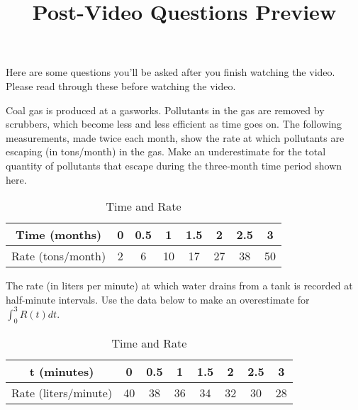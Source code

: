 \documentclass[handout]{ximera}
\title{Post-Video Questions Preview}
\begin{document}
\begin{abstract}
\end{abstract}


\maketitle

Here are some questions you’ll be asked after you finish watching the video. Please read through these before watching the video.

\begin{problem}
Coal gas is produced at a gasworks. Pollutants in the gas are removed by scrubbers, which become less and less efficient as time goes on. The following measurements, made twice each month, show the rate at which pollutants are escaping (in tons/month) in the gas. Make an underestimate for the total quantity of pollutants that escape during the three-month time period shown here.

\begin{table}[h!]
\centering
\caption{Time and Rate}
\label{my-label2}
\begin{tabular}{|c|c|c|c|c|c|c|c|}
\hline
Time (months)     & 0 & 0.5 & 1  & 1.5 & 2  & 2.5 & 3  \\
\hline
Rate (tons/month) & 2 & 6   & 10 & 17  & 27 & 38  & 50 \\
\hline
\end{tabular}
\end{table}

\end{problem}

\begin{problem}
The rate (in liters per minute) at which water drains from a tank is recorded at half-minute intervals. Use the data below to make an overestimate for $\int_0^3 R(t) dt$.
\begin{table}[h!]
\centering
\caption{Time and Rate}
\label{my-label3}
\begin{tabular}{|c|c|c|c|c|c|c|c|}
\hline
t (minutes)          & 0  & 0.5 & 1  & 1.5 & 2  & 2.5 & 3  \\
\hline
Rate (liters/minute) & 40 & 38  & 36 & 34  & 32 & 30  & 28 \\
\hline
\end{tabular}
\end{table}

\end{problem}
\end{document}
